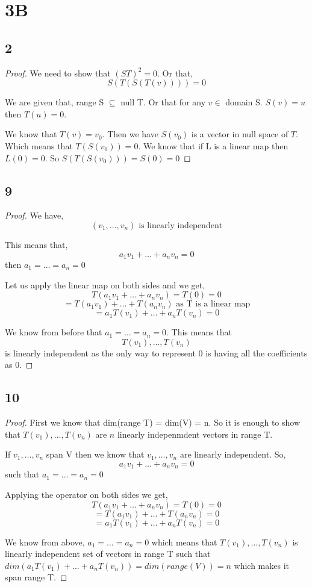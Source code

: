 \documentclass[a4paper]{report}
\begin{document}
\section*{3B}
\subsection*{2}

\begin{proof}
    We need to show that $(ST)^2 = 0$. Or that, 
    $$ S(T(S(T(v)))) = 0 $$ 

    We are given that, range S $\subseteq $ null T. Or that for any  $v \in $ domain S. $S(v) = u$ then  $T(u) = 0$.

    We know that $T(v) = v_0$. Then we have $S(v_0)$ is a vector in null space of $T$. Which means that $T(S(v_0)) = 0$. We know that if L is a linear map then $L(0) =0$. So $S(T(S(v_0))) = S(0) =0$
    

\end{proof}
\subsection*{9}
\begin{proof}
    
We have, 
$$ (v_1,\dots,v_n) \text{ is linearly independent}$$  

This means that, 
$$ a_1v_1+ \dots + a_nv_n = 0 $$  then $a_1= \dots = a_n = 0$

Let us apply the linear map on both sides and we get, 
$$ T(a_1v_1+ \dots + a_nv_n) = T(0) = 0 $$ 
$$ = T(a_1v_1) + \dots + T(a_nv_n) \text{ as T is a linear map}$$
$$ = a_1T(v_1) + \dots + a_nT(v_n) = 0 $$ 

We know from before that $a_1= \dots = a_n = 0$. This means that 
$$ T(v_1),\dots,T(v_n)$$ is linearly independent as the only way to represent $0$ is having all the coefficients as 0.


\end{proof}
\subsection*{10}
\begin{proof}
    
First we know that dim(range T) = dim(V) = n. So it is enough to show that $T(v_1), \dots, T(v_n)$ are $n$ linearly indepenmdent vectors in range T.

If $v_1,\dots,v_n$ span V then we know that $v_1,\dots,v_n$ are linearly independent. So, 
$$ a_1v_1+\dots+a_nv_n = 0 $$  such that $a_1=\dots=a_n = 0$

Applying the operator on both sides we get, 
$$ T(a_1v_1+\dots + a_nv_n) = T(0) = 0 $$ 
$$ = T(a_1v_1) + \dots + T(a_nv_n) = 0 $$ 
$$ = a_1T(v_1) + \dots +a_nT(v_n) = 0 $$ 

We know from above, $a_1 = \dots = a_n = 0$ which means that $T(v_1), \dots, T(v_n)$ is linearly independent set of vectors in range T such that  $dim(a_1T(v_1) + \dots + a_nT(v_n)) = dim(range(V)) = n$ which makes it span range T.

\end{proof}
\end{document}
